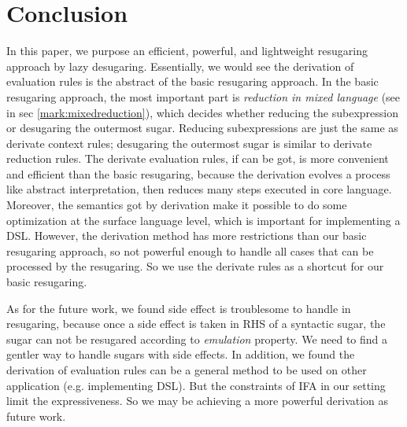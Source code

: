 \section{Conclusion}
\label{sec7}


In this paper, we purpose an efficient, powerful, and lightweight resugaring approach by lazy desugaring. Essentially, we would see the derivation of evaluation rules is the abstract of the basic resugaring approach. In the basic resugaring approach, the most important part is \emph{reduction in mixed language} (see in sec \ref{mark:mixedreduction}), which decides whether reducing the subexpression or desugaring the outermost sugar. Reducing subexpressions are just the same as derivate context rules; desugaring the outermost sugar is similar to derivate reduction rules. The derivate evaluation rules, if can be got, is more convenient and efficient than the basic resugaring, because the derivation evolves a process like abstract interpretation\cite{AbstractInterpretation}, then reduces many steps executed in core language. Moreover, the semantics got by derivation make it possible to do some optimization at the surface language level, which is important for implementing a DSL. However, the derivation method has more restrictions than our basic resugaring approach, so not powerful enough to handle all cases that can be processed by the resugaring. So we use the derivate rules as a shortcut for our basic resugaring.

As for the future work, we found side effect is troublesome to handle in resugaring, because once a side effect is taken in RHS of a syntactic sugar, the sugar can not be resugared according to \emph{emulation} property. We need to find a gentler way to handle sugars with side effects. In addition, we found the derivation of evaluation rules can be a general method to be used on other application (e.g. implementing DSL). But the constraints of IFA in our setting limit the expressiveness. So we may be achieving a more powerful derivation as future work.